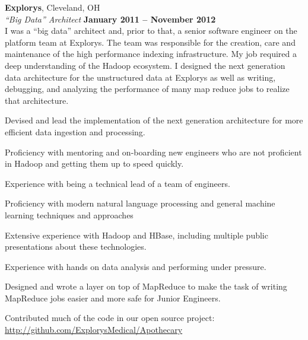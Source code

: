 \documentclass[margin,line,12pt]{resume}
\begin{document}
\begin{resume}
    \textbf{Explorys}, Cleveland, OH \vspace{2mm}\\\vspace{1mm}%
    \textsl{``Big Data'' Architect} \hfill \textbf{January 2011 -- November 2012}\\
    I was a ``big data'' architect and, prior to that, a senior software engineer on the platform team at Explorys. 
    The team was responsible for the creation, care and maintenance of the high performance indexing infrastructure.
    My job required a deep understanding of the Hadoop ecosystem.  I designed the next generation data 
    architecture for the unstructured data at Explorys as well as writing, debugging, and analyzing the 
    performance of many map reduce jobs to realize that architecture.  

    \begin{list2}
    \item  Devised and lead the implementation of the next generation architecture for more efficient data ingestion and processing.
    \item  Proficiency with mentoring and on-boarding new engineers who are not proficient in Hadoop and getting them up to speed quickly.
    \item  Experience with being a technical lead of a team of engineers.
    \item  Proficiency with modern natural language processing and general machine learning techniques and approaches
    \item  Extensive experience with Hadoop and HBase, including multiple public presentations about these technologies.
    \item  Experience with hands on data analysis and performing under pressure.
    \item  Designed and wrote a layer on top of MapReduce to make the task of writing MapReduce jobs easier and more safe for Junior Engineers.
    \item  Contributed much of the code in our open source project: \\\url{http://github.com/ExplorysMedical/Apothecary}
    \end{list2}

    \newpage
    \vspace*{1mm}


\end{resume}
\end{document}
